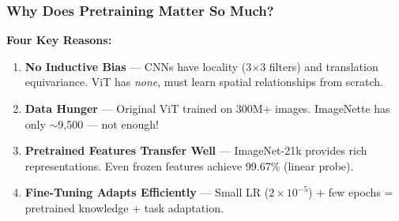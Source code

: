 \documentclass[aspectratio=169]{beamer}
\begin{document}
\begin{frame}
    \frametitle{Why Does Pretraining Matter So Much?}
    \footnotesize
    \textbf{Four Key Reasons:}
    \begin{enumerate}
        \item \textbf{No Inductive Bias} --- CNNs have locality (3$\times$3 filters) and translation equivariance. ViT has \textit{none}, must learn spatial relationships from scratch.

        \item \textbf{Data Hunger} --- Original ViT trained on 300M+ images. ImageNette has only $\sim$9,500 --- not enough!

        \item \textbf{Pretrained Features Transfer Well} --- ImageNet-21k provides rich representations. Even frozen features achieve 99.67\% (linear probe).

        \item \textbf{Fine-Tuning Adapts Efficiently} --- Small LR ($2 \times 10^{-5}$) + few epochs = pretrained knowledge + task adaptation.
    \end{enumerate}
\end{frame}
\end{document}
